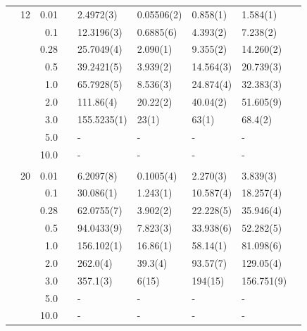 \begin{table}[h]
\begin{tabularx}{\textwidth}{R{1cm}rrcR{2.3cm}R{2.3cm}R{2.3cm}R{2.3cm}R{1cm}}
		&12 & 0.01 && 2.4972(3) & 0.05506(2) & 0.858(1) & 1.584(1)\\
		&& 0.1 && 12.3196(3) & 0.6885(6) & 4.393(2) & 7.238(2) \\
		&& 0.28 && 25.7049(4) & 2.090(1) & 9.355(2) & 14.260(2) \\
		&& 0.5 && 39.2421(5) & 3.939(2) & 14.564(3) & 20.739(3) \\
		&& 1.0 && 65.7928(5) & 8.536(3) & 24.874(4) & 32.383(3) \\
		&& 2.0 && 111.86(4) & 20.22(2) & 40.04(2) & 51.605(9) \\
		&& 3.0 && 155.5235(1) & 23(1) & 63(1) & 68.4(2) \\ 
		&& 5.0 && - & - & - & -\\
		&& 10.0 && - & - & - & -\\
		\hdashline \\
		
		&20 & 0.01 && 6.2097(8) & 0.1005(4) & 2.270(3) & 3.839(3) \\
		&& 0.1 && 30.086(1) & 1.243(1) & 10.587(4) & 18.257(4) \\
		&& 0.28 && 62.0755(7) & 3.902(2) & 22.228(5) & 35.946(4) \\
		&& 0.5 && 94.0433(9) & 7.823(3) & 33.938(6) & 52.282(5) \\
		&& 1.0 && 156.102(1) & 16.86(1) & 58.14(1) & 81.098(6) \\
		&& 2.0 && 262.0(4) & 39.3(4) & 93.57(7) & 129.05(4) \\
		&& 3.0 && 357.1(3) & 6(15) & 194(15) & 156.751(9) \\ 
		&& 5.0 && - & - & - & -\\
		&& 10.0 && - & - & - & -\\
		\hline \hline
	\end{tabularx}
\end{table} 

